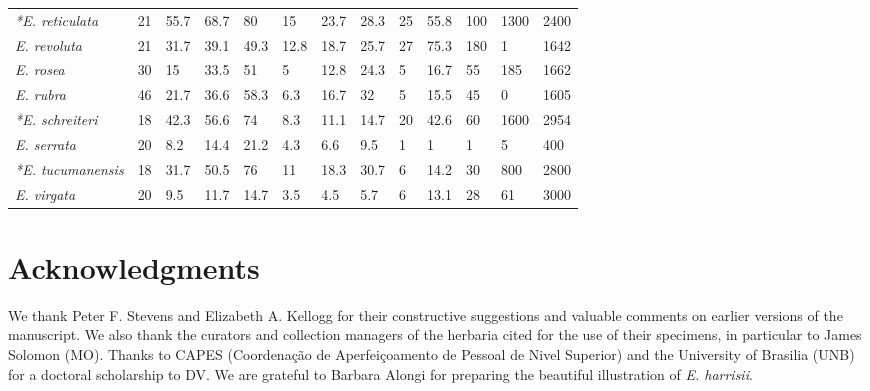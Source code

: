 \documentclass[fleqn,10pt,lineno]{wlpeerj} %
\begin{document}
\begin{table}[hbt]
\begin{center}
\begin{tabular}{lllllllllllll}
\emph{*E. reticulata} & 21 & 55.7 & 68.7 & 80 & 15 & 23.7 & 28.3 & 25 & 55.8 & 100 & 1300 & 2400\\
\emph{E. revoluta} & 21 & 31.7 & 39.1 & 49.3 & 12.8 & 18.7 & 25.7 & 27 & 75.3 & 180 & 1 & 1642\\
\emph{E. rosea} & 30 & 15 & 33.5 & 51 & 5 & 12.8 & 24.3 & 5 & 16.7 & 55 & 185 & 1662\\
\emph{E. rubra} & 46 & 21.7 & 36.6 & 58.3 & 6.3 & 16.7 & 32 & 5 & 15.5 & 45 & 0 & 1605\\
\emph{*E. schreiteri} & 18 & 42.3 & 56.6 & 74 & 8.3 & 11.1 & 14.7 & 20 & 42.6 & 60 & 1600 & 2954\\
\emph{E. serrata} & 20 & 8.2 & 14.4 & 21.2 & 4.3 & 6.6 & 9.5 & 1 & 1 & 1 & 5 & 400\\
\emph{*E. tucumanensis} & 18 & 31.7 & 50.5 & 76 & 11 & 18.3 & 30.7 & 6 & 14.2 & 30 & 800 & 2800\\
\emph{E. virgata} & 20 & 9.5 & 11.7 & 14.7 & 3.5 & 4.5 & 5.7 & 6 & 13.1 & 28 & 61 & 3000\\
\bottomrule
\end{tabular}
\end{center}
\end{table}


\section*{Acknowledgments}
We thank Peter F. Stevens and Elizabeth A. Kellogg for their constructive suggestions and valuable comments on earlier versions of the manuscript. We also thank the curators and collection managers of the herbaria cited for the use of their specimens, in particular to James Solomon (MO). Thanks to CAPES (Coordenação de Aperfeiçoamento de Pessoal de Nivel Superior) and the University of Brasilia (UNB) for a doctoral scholarship to DV. We are grateful to Barbara Alongi for preparing the beautiful illustration of \emph{E. harrisii}.


\end{document}
